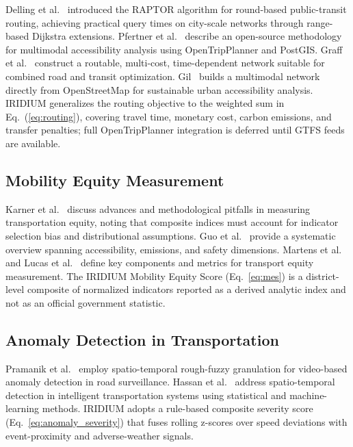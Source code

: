Delling et al.\ \cite{delling2015raptor} introduced the RAPTOR algorithm
for round-based public-transit routing, achieving practical query times
on city-scale networks through range-based Dijkstra extensions.
Pfertner et al.\ \cite{pfertner2023multimodal_accessibility} describe an
open-source methodology for multimodal accessibility analysis using
OpenTripPlanner and PostGIS.
Graff et al.\ \cite{graff2024nomad} construct a routable, multi-cost,
time-dependent network suitable for combined road and transit optimization.
Gil~\cite{gil2015multimodal_osm_accessibility} builds a multimodal network
directly from OpenStreetMap for sustainable urban accessibility analysis.
IRIDIUM generalizes the routing objective to the weighted sum in
Eq.~(\ref{eq:routing}), covering travel time, monetary cost, carbon
emissions, and transfer penalties; full OpenTripPlanner integration is
deferred until GTFS feeds are available.

\subsection{Mobility Equity Measurement}

Karner et al.\ \cite{karner2025transportation_equity} discuss advances and
methodological pitfalls in measuring transportation equity, noting that
composite indices must account for indicator selection bias and distributional
assumptions.
Guo et al.\ \cite{guo2020transportation_equity_overview} provide a systematic
overview spanning accessibility, emissions, and safety dimensions.
Martens et al.\ \cite{martens2019measuring_transport_equity_metrics} and
Lucas et al.\ \cite{lucas2019measuring_transport_equity_book} define
key components and metrics for transport equity measurement.
The IRIDIUM Mobility Equity Score (Eq.~\ref{eq:mes}) is a district-level
composite of normalized indicators reported as a derived analytic index and
not as an official government statistic.

\subsection{Anomaly Detection in Transportation}

Pramanik et al.\ \cite{pramanik2022traffic_anomaly_video} employ
spatio-temporal rough-fuzzy granulation for video-based anomaly detection
in road surveillance.
Hassan et al.\ \cite{hassan2019spatiotemporal_anomaly_its} address
spatio-temporal detection in intelligent transportation systems using
statistical and machine-learning methods.
IRIDIUM adopts a rule-based composite severity score
(Eq.~\ref{eq:anomaly_severity}) that fuses rolling z-scores over speed
deviations with event-proximity and adverse-weather signals.

